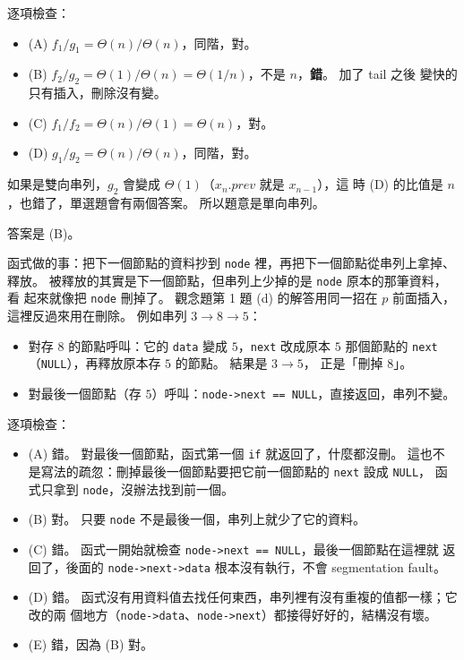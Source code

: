逐項檢查：
\begin{itemize}
\item (A) $f_1 / g_1 = \Theta(n) / \Theta(n)$，同階，對。
\item (B) $f_2 / g_2 = \Theta(1) / \Theta(n) = \Theta(1/n)$，不是 $n$，\textbf{錯}。 加了 tail 之後
變快的只有插入，刪除沒有變。
\item (C) $f_1 / f_2 = \Theta(n) / \Theta(1) = \Theta(n)$，對。
\item (D) $g_1 / g_2 = \Theta(n) / \Theta(n)$，同階，對。
\end{itemize}

如果是雙向串列，$g_2$ 會變成 $\Theta(1)$（$x_n.\mathit{prev}$ 就是 $x_{n-1}$），這
時 (D) 的比值是 $n$，也錯了，單選題會有兩個答案。 所以題意是單向串列。

答案是 (B)。

函式做的事：把下一個節點的資料抄到 \texttt{node} 裡，再把下一個節點從串列上拿掉、
釋放。 被釋放的其實是下一個節點，但串列上少掉的是 \texttt{node} 原本的那筆資料，看
起來就像把 \texttt{node} 刪掉了。 觀念題第 1 題 (d) 的解答用同一招在 $p$ 前面插入，
這裡反過來用在刪除。 例如串列 $3 \to 8 \to 5$：
\begin{itemize}
\item 對存 $8$ 的節點呼叫：它的 \texttt{data} 變成 $5$，\texttt{next} 改成原本 $5$
那個節點的 \texttt{next}（\texttt{NULL}），再釋放原本存 $5$ 的節點。 結果是 $3 \to 5$，
正是「刪掉 $8$」。
\item 對最後一個節點（存 $5$）呼叫：\texttt{node->next == NULL}，直接返回，串列不變。
\end{itemize}

逐項檢查：
\begin{itemize}
\item (A) 錯。 對最後一個節點，函式第一個 \texttt{if} 就返回了，什麼都沒刪。 這也不
是寫法的疏忽：刪掉最後一個節點要把它前一個節點的 \texttt{next} 設成 \texttt{NULL}，
函式只拿到 \texttt{node}，沒辦法找到前一個。
\item (B) 對。 只要 \texttt{node} 不是最後一個，串列上就少了它的資料。
\item (C) 錯。 函式一開始就檢查 \texttt{node->next == NULL}，最後一個節點在這裡就
返回了，後面的 \texttt{node->next->data} 根本沒有執行，不會 segmentation fault。
\item (D) 錯。 函式沒有用資料值去找任何東西，串列裡有沒有重複的值都一樣；它改的兩
個地方（\texttt{node->data}、\texttt{node->next}）都接得好好的，結構沒有壞。
\item (E) 錯，因為 (B) 對。
\end{itemize}

